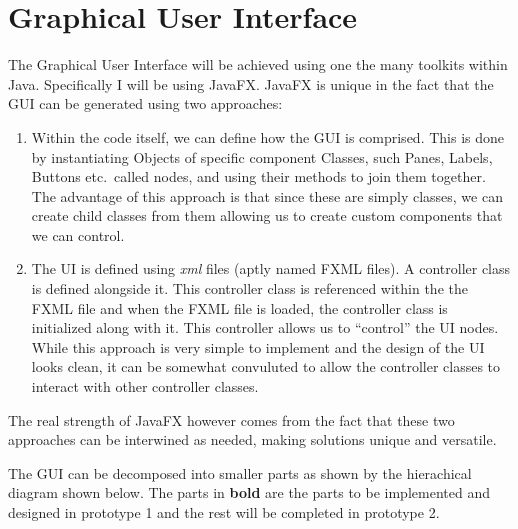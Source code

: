 \documentclass[../../../../main.tex]{subfiles}
\begin{document}
\section{Graphical User Interface}
The Graphical User Interface will be achieved using one the many toolkits within Java. Specifically I will be using JavaFX\cite{javafx}. JavaFX is unique in the fact that the GUI can be generated using two approaches:
\begin{enumerate}
\item Within the code itself, we can define how the GUI\cite{javafxEx} is comprised. This is done by instantiating Objects of specific component Classes, such Panes, Labels, Buttons etc.\ called nodes, and using their methods to join them together. The advantage of this approach is that since these are simply classes, we can create child classes from them allowing us to create custom components that we can control.
\item The UI is defined using \textit{xml} files (aptly named FXML\cite{fxml} files). A controller class is defined alongside it. This controller class is referenced within the the FXML file and when the FXML file is loaded, the controller class is initialized along with it. This controller allows us to ``control'' the UI nodes. While this approach is very simple to implement and the design of the UI looks clean, it can be somewhat convuluted to allow the controller classes to interact with other controller classes.
\end{enumerate}
The real strength of JavaFX however comes from the fact that these two approaches can be interwined as needed, making solutions unique and versatile. 

The GUI can be decomposed into smaller parts as shown by the hierachical diagram shown below. The parts in \textbf{bold} are the parts to be implemented and designed in prototype 1 and the rest will be completed in prototype 2.
\end{document}
